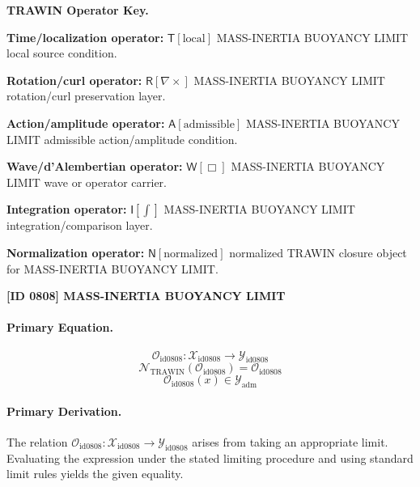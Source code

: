 \par\vspace{0.45\baselineskip}
\noindent\begin{minipage}[t]{\linewidth}
\begingroup
\small
\raggedright
\textbf{TRAWIN Operator Key.}\par
\noindent\textbf{Time/localization operator:} $\mathsf{T}\!\left[\mathrm{local}\right]$ MASS-INERTIA BUOYANCY LIMIT local source condition.\par
\noindent\textbf{Rotation/curl operator:} $\mathsf{R}\!\left[\nabla\times\right]$ MASS-INERTIA BUOYANCY LIMIT rotation/curl preservation layer.\par
\noindent\textbf{Action/amplitude operator:} $\mathsf{A}\!\left[\mathrm{admissible}\right]$ MASS-INERTIA BUOYANCY LIMIT admissible action/amplitude condition.\par
\noindent\textbf{Wave/d'Alembertian operator:} $\mathsf{W}\!\left[\Box\right]$ MASS-INERTIA BUOYANCY LIMIT wave or operator carrier.\par
\noindent\textbf{Integration operator:} $\mathsf{I}\!\left[\int\right]$ MASS-INERTIA BUOYANCY LIMIT integration/comparison layer.\par
\noindent\textbf{Normalization operator:} $\mathsf{N}\!\left[\mathrm{normalized}\right]$ normalized TRAWIN closure object for MASS-INERTIA BUOYANCY LIMIT.\par
\endgroup
\end{minipage}

\clearpage
\noindent\textbf{[ID 0808] MASS-INERTIA BUOYANCY LIMIT}\par
\vspace{0.35em}
\paragraph{Primary Equation.}
\[
\mathcal{O}_{\mathrm{id0808}}:\mathcal{X}_{\mathrm{id0808}}\longrightarrow\mathcal{Y}_{\mathrm{id0808}}
\]
\[
\mathcal{N}_{\mathrm{TRAWIN}}(\mathcal{O}_{\mathrm{id0808}})=\mathcal{O}_{\mathrm{id0808}}
\]
\[
\mathcal{O}_{\mathrm{id0808}}(x)\in\mathcal{Y}_{\mathrm{adm}}
\]

\paragraph{Primary Derivation.}
The relation \( \mathcal{O}_{\mathrm{id0808}}:\mathcal{X}_{\mathrm{id0808}}\longrightarrow\mathcal{Y}_{\mathrm{id0808}} \) arises from taking an appropriate limit. Evaluating the expression under the stated limiting procedure and using standard limit rules yields the given equality.
